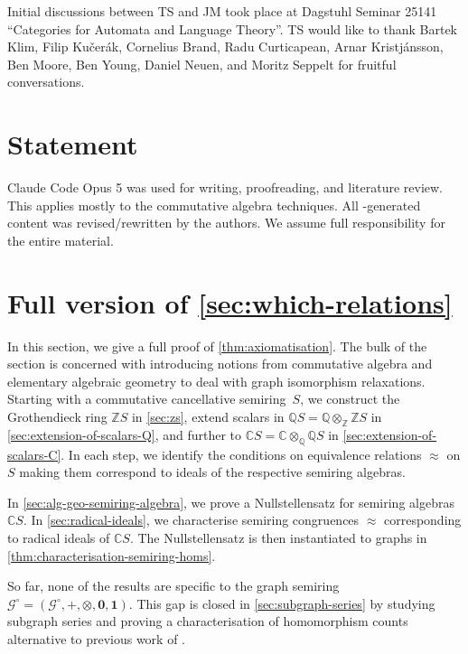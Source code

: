 \documentclass[11pt]{scrartcl}
\theoremstyle{definition}
\theoremstyle{plain}
\theoremstyle{remark}
\newcommand{\lG}{\mathcal{G}^\circ}
\begin{document}
    Initial discussions between TS and JM  took place at   Dagstuhl Seminar 25141 \enquote{Categories for Automata and Language Theory}.
    TS would like to thank Bartek Klim,
	Filip Ku\v{c}er\'ak, Cornelius Brand, Radu Curticapean, Arnar Kristjánsson, Ben Moore, Ben Young, Daniel Neuen, and Moritz Seppelt for fruitful conversations.


    \section*{ Statement}

    Claude Code Opus 5 was used for writing, proofreading, and literature review. This applies mostly to the commutative algebra techniques. All -generated content was revised/rewritten by the authors. We assume full responsibility for the entire material.



	\section{Full version of \texorpdfstring{\cref{sec:which-relations}}{Axiomatisation}}
	\label{app:which-relations}

	In this section, we give a full proof of \cref{thm:axiomatisation}.
	The bulk of the section  is concerned with introducing notions from commutative algebra and elementary algebraic geometry to deal with graph isomorphism relaxations.
	Starting with a commutative cancellative semiring~$S$,
	we construct the Grothendieck ring $\mathbb{Z}S$ in \cref{sec:zs},
	extend scalars in $\mathbb{Q}S = \mathbb{Q} \otimes_{\mathbb{Z}} \mathbb{Z}S$ in \cref{sec:extension-of-scalars-Q},
	and further to $\mathbb{C}S = \mathbb{C} \otimes_{\mathbb{Q}} \mathbb{Q}S$ in \cref{sec:extension-of-scalars-C}.
	In each step, we identify the conditions on equivalence relations $\approx$ on $S$ making them correspond to ideals of the respective semiring algebras.
	
	In \cref{sec:alg-geo-semiring-algebra}, we prove a Nullstellensatz for semiring algebras $\mathbb{C}S$.
    In \cref{sec:radical-ideals}, we characterise semiring congruences $\approx$ corresponding to radical ideals of $\mathbb{C}S$.
	The Nullstellensatz is then instantiated to graphs in \cref{thm:characterisation-semiring-homs}.

	So far, none of the results are specific to the graph semiring $\lG = (\lG, +, \otimes, \boldsymbol{0}, \boldsymbol{1})$.
	This gap is closed in \cref{sec:subgraph-series} by studying subgraph series and proving a characterisation of homomorphism counts alternative to previous work of \textcite{lovasz_dual_2010}.
\end{document}
